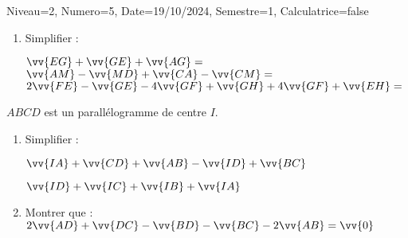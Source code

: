 \documentclass[a4paper,12pt]{article}
\begin{document}
\begin{Maquette}[DS]{Niveau=2, Numero=5, Date=19/10/2024, Semestre=1, Calculatrice=false}
\begin{exercice}
\begin{enumerate}
\item{} Simplifier :

\(\vv{EG}+\vv{GE}+\vv{AG}= \)\anserline[2]
\(\vv{AM}-\vv{MD}+\vv{CA}-\vv{CM}= \)\anserline[2]
\(2\vv{FE}-\vv{GE}-4\vv{GF}+\vv{GH}+4\vv{GF}+\vv{EH}= \)\anserline[2]
\end{enumerate}
\end{exercice}

\begin{exercice}
$ABCD$ est un parallélogramme de centre $I$.
\begin{enumerate}
\item{} Simplifier :
\begin{multicols}{2}
$\vv{IA}+\vv{CD}+\vv{AB}-\vv{ID}+\vv{BC}$

\anserline[5]
\columnbreak

$\vv{ID}+\vv{IC}+\vv{IB}+\vv{IA}$

\anserline[5]
\end{multicols}
\item{} Montrer que : $2\vv{AD}+\vv{DC}-\vv{BD}-\vv{BC}-2\vv{AB}=\vv{0}$

\anserline[10]
\end{enumerate}
\end{exercice}

\end{Maquette}
\end{document}
